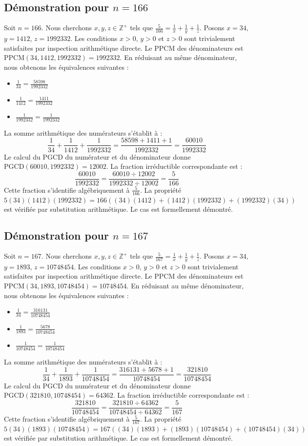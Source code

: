 \documentclass[12pt,a4paper]{article}
\begin{document}
\subsection{Démonstration pour $n = 166$}
Soit $n = 166$. Nous cherchons $x, y, z \in \mathbb{Z}^{+}$ tels que $\frac{5}{166} = \frac{1}{x} + \frac{1}{y} + \frac{1}{z}$.
Posons $x = 34$, $y = 1412$, $z = 1992332$.
Les conditions $x > 0$, $y > 0$ et $z > 0$ sont trivialement satisfaites par inspection arithmétique directe.
Le PPCM des dénominateurs est $\text{PPCM}(34, 1412, 1992332) = 1992332$.
En réduisant au même dénominateur, nous obtenons les équivalences suivantes :
\begin{itemize}
    \item $\frac{1}{34} = \frac{58598}{1992332}$
    \item $\frac{1}{1412} = \frac{1411}{1992332}$
    \item $\frac{1}{1992332} = \frac{1}{1992332}$
\end{itemize}
La somme arithmétique des numérateurs s'établit à :
$$ \frac{1}{34} + \frac{1}{1412} + \frac{1}{1992332} = \frac{58598 + 1411 + 1}{1992332} = \frac{60010}{1992332} $$
Le calcul du PGCD du numérateur et du dénominateur donne $\text{PGCD}(60010, 1992332) = 12002$.
La fraction irréductible correspondante est :
$$ \frac{60010}{1992332} = \frac{60010 \div 12002}{1992332 \div 12002} = \frac{5}{166} $$
Cette fraction s'identifie algébriquement à $\frac{5}{166}$.
La propriété $5(34)(1412)(1992332) = 166((34)(1412) + (1412)(1992332) + (1992332)(34))$ est vérifiée par substitution arithmétique.
Le cas est formellement démontré.

\subsection{Démonstration pour $n = 167$}
Soit $n = 167$. Nous cherchons $x, y, z \in \mathbb{Z}^{+}$ tels que $\frac{5}{167} = \frac{1}{x} + \frac{1}{y} + \frac{1}{z}$.
Posons $x = 34$, $y = 1893$, $z = 10748454$.
Les conditions $x > 0$, $y > 0$ et $z > 0$ sont trivialement satisfaites par inspection arithmétique directe.
Le PPCM des dénominateurs est $\text{PPCM}(34, 1893, 10748454) = 10748454$.
En réduisant au même dénominateur, nous obtenons les équivalences suivantes :
\begin{itemize}
    \item $\frac{1}{34} = \frac{316131}{10748454}$
    \item $\frac{1}{1893} = \frac{5678}{10748454}$
    \item $\frac{1}{10748454} = \frac{1}{10748454}$
\end{itemize}
La somme arithmétique des numérateurs s'établit à :
$$ \frac{1}{34} + \frac{1}{1893} + \frac{1}{10748454} = \frac{316131 + 5678 + 1}{10748454} = \frac{321810}{10748454} $$
Le calcul du PGCD du numérateur et du dénominateur donne $\text{PGCD}(321810, 10748454) = 64362$.
La fraction irréductible correspondante est :
$$ \frac{321810}{10748454} = \frac{321810 \div 64362}{10748454 \div 64362} = \frac{5}{167} $$
Cette fraction s'identifie algébriquement à $\frac{5}{167}$.
La propriété $5(34)(1893)(10748454) = 167((34)(1893) + (1893)(10748454) + (10748454)(34))$ est vérifiée par substitution arithmétique.
Le cas est formellement démontré.
\end{document}
